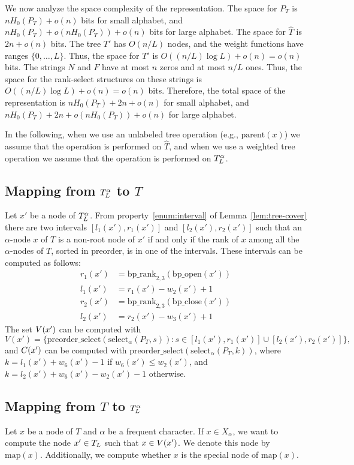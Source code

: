 \documentclass[12pt]{article}
\newcommand{\parentb}{\mathrm{parent}}
\newcommand{\preorderselectb}{\mathrm{preorder\_select}}
\newcommand{\bprankb}{\mathrm{bp\_rank}}
\newcommand{\bpopenb}{\mathrm{bp\_open}}
\newcommand{\bpcloseb}{\mathrm{bp\_close}}
\newcommand{\parentx}[1]{\parentb(#1)}
\newcommand{\preorderselectx}[1]{\preorderselectb(#1)}
\newcommand{\idxle}{2}
\newcommand{\idxgt}{3}
\newcommand{\idxleftmostchild}{6}
\newcommand{\bprank}[2]{\bprankb_{#1}(#2)}
\newcommand{\bpopen}[1]{\bpopenb(#1)}
\newcommand{\bpclose}[1]{\bpcloseb(#1)}
\newcommand{\select}[3]{\mathrm{select}_{#1}(#2,#3)}
\newcommand{\map}[1]{\mathrm{map}(#1)}
\newcommand{\range}[2]{\{#1,\ldots,#2\}}
\begin{document}
We now analyze the space complexity of the representation.
The space for $P_T$ is $n H_0(P_T)+o(n)$ bits for small alphabet,
and $n H_0(P_T)+o(n H_0(P_T))+o(n)$ bits for large alphabet.
The space for $\hat{T}$ is $2n+o(n)$ bits.
The tree $T'$ has $O(n/L)$ nodes, and the weight functions have ranges
$\range{0}{L}$. Thus, the space for $T'$ is $O((n/L)\log L)+o(n)=o(n)$ bits.
The strings $N$ and $F$ have at most $n$ zeros and at most $n/L$ ones.
Thus, the space for the rank-select structures on these strings is
$O((n/L)\log L)+o(n)=o(n)$ bits.
Therefore, the total space of the representation
is $n H_0(P_T)+2n+o(n)$ for small alphabet,
and $n H_0(P_T)+2n+o(n H_0(P_T))+o(n)$ for large alphabet.

In the following, when we use an unlabeled tree operation
(e.g., $\parentx{x}$) we assume that the operation is performed on
$\hat{T}$, and when we use a weighted tree operation  we assume that the
operation is performed on $T^\alpha_{L}$.

\subsection{Mapping from $T^\alpha_{L}$ to $T$}

Let $x'$ be a node of $ T^\alpha_{L}$.
From property~\ref{enum:interval} of Lemma~\ref{lem:tree-cover} there are
two intervals $[l_1(x'),r_1(x')]$ and $[l_2(x'),r_2(x')]$
such that an $\alpha$-node $x$ of $T$ is a non-root node of $x'$
if and only if the rank of $x$ among all the $\alpha$-nodes of $T$,
sorted in preorder, is in one of the intervals.
These intervals can be computed as follows:
\begin{align*}
r_1(x') & = \bprank{\idxle,\idxgt}{\bpopen{x'}}\\
l_1(x') & = r_1(x')-w_{\idxle}(x')+1\\
r_2(x') & = \bprank{\idxle,\idxgt}{\bpclose{x'}}\\
l_2(x') & = r_2(x')-w_{\idxgt}(x')+1
\end{align*}
The set $V(x')$ can be computed with
\[ V(x') = \{\preorderselectx{\select{\alpha}{P_T}{s}}
  : s \in [l_1(x'),r_1(x')]\cup[l_2(x'),r_2(x')] \}, \]
and $C(x')$ can be computed with $\preorderselectx{\select{\alpha}{P_T}{k}}$,
where $k = l_1(x')+w_{\idxleftmostchild}(x')-1$ if
$w_{\idxleftmostchild}(x') \leq w_{\idxle}(x')$,
and $k = l_2(x')+w_{\idxleftmostchild}(x')-w_{\idxle}(x')-1$ otherwise.

\subsection{Mapping from $T$ to $T^\alpha_{L}$}
Let $x$ be a node of $T$ and $\alpha$ be a frequent character.
If $x\in X_\alpha$, we want to compute the node $x'\in T_{L}$ such
that $x\in V(x')$.
We denote this node by $\map{x}$.
Additionally, we compute whether $x$ is the special node of $\map{x}$.
\end{document}
